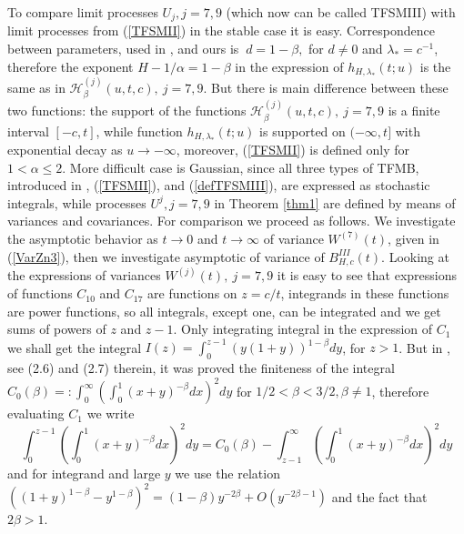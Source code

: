 \documentclass[12pt]{article}
\def\a{\alpha}
\def\b{\beta}
\def\l{\lambda}
\def\H{{\mathscr H}}
\theoremstyle{plain}
\theoremstyle{definition}
\begin{document}
To compare limit processes $U_j, j=7,9$ (which now can be called TFSMIII) with limit processes from (\ref{TFSMII}) in the stable case it is easy. Correspondence between parameters, used in \cite{Sabzikar}, and ours is  $\ d=1-\b,$ for $d\ne 0 $ and $\l_*=c^{-1}$, therefore the exponent $H-1/\a=1-\b$  in the expression of $h_{H, \l_*} (t; u)$ is the same as in $\H_{\b}^{(j)}(u,t,c), \ j=7,9$. But there is  main difference between these two functions: the support of the functions $\H_{\b}^{(j)}(u,t,c), \ j=7,9$ is a finite interval $[-c, t]$, while function $h_{H, \l_*} (t; u)$ is supported on $(-\infty, t]$ with exponential decay as $u\to -\infty$, moreover, (\ref{TFSMII}) is defined only for $1<\a\le 2$.
 More difficult case is Gaussian, since  all three types of TFMB, introduced in \cite{Sabzikar1}, (\ref{TFSMII}), and (\ref{defTFSMIII}), are  expressed as stochastic integrals, while processes    $U^{j}, j=7, 9$ in Theorem \ref{thm1} are defined by means of variances and covariances. For comparison we proceed as follows. We investigate the asymptotic behavior as $t\to 0$ and $t\to \infty$ of  variance $W^{(7)}(t)$, given in (\ref{VarZn3}), then we investigate asymptotic of variance of $B_{H, c}^{III}(t)$.
Looking at the expressions of variances $W^{(j)}(t), \ j=7, 9$ it is easy to see that expressions of functions $C_{10}$ and $C_{17}$ are functions on $z=c/t$, integrands in these functions are power functions, so all integrals, except one, can be integrated and we get sums of powers of $z$ and  $z-1$. Only integrating integral in the expression of $C_{1}$ we shall  get the integral $I(z)=\int_0^{z-1} (y(1+y))^{1-\b} dy$, for $z>1$. But in \cite{Paul21}, see (2.6) and (2.7) therein, it was proved the finiteness of the integral $C_0(\b)=:\int_0^{\infty}\left (\int_0^{1}(x+y)^{-\b} dx\right )^2 dy$ for $1/2<\b<3/2, \b\ne 1$, therefore evaluating $C_1$ we write
$$
\int_0^{z-1}\left (\int_0^{1}(x+y)^{-\b} dx\right )^2 dy=C_0(\b)- \int_{z-1}^{\infty}\left (\int_0^{1}(x+y)^{-\b} dx\right )^2 dy
$$
and for integrand and large $y$ we use the relation $\left ((1+y)^{1-\b}-y^{1-\b} \right )^2= (1-\b)y^{-2\b}+O(y^{-2\b-1})$ and the fact that $2\b>1$.
\end{document}
